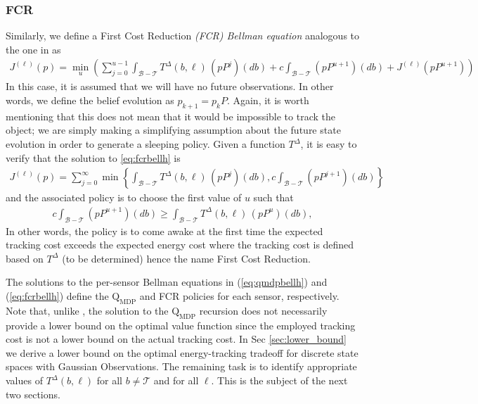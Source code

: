 \documentclass[journal,draftcls,onecolumn,11pt]{IEEEtran}
\newcommand{\QMDP}{$\text{Q}_{\text{MDP}}$}
\newcommand{\term}{\mathcal{T}}
\begin{document}
\subsubsection{FCR}
Similarly, we define a First Cost Reduction {\em (FCR) Bellman equation} analogous to the one in \cite{fuemmeler08} as
\begin{align} \label{eq:fcrbellh}
   J^{(\ell)}(p) = \min_{u} \left(
      \sum_{j=0}^{u-1} \int_{\mathcal{B}-\term} T^\Delta(b,\ell) \, (p P^j)(db) +
      c \int_{\mathcal{B}-\term}  (p P^{u+1})(db) +
      J^{(\ell)}(p P^{u+1})
   \right)
\end{align}
In this case, it is assumed that we will have no future observations. In other words, we define the belief evolution as $p_{k+1}=p_kP$. Again, it is worth mentioning that this does not mean that it would be impossible to track the object; we are simply making a simplifying assumption about the future state evolution in order to generate a sleeping policy. Given a function $T^\Delta$, it is easy to verify that the solution to \eqref{eq:fcrbellh} is
\begin{align}
   J^{(\ell)}(p) = \sum_{j=0}^{\infty} \min \left\{
      \int_{\mathcal{B}-\term} T^\Delta(b,\ell) \, (p P^j)(db),
      c \int_{\mathcal{B}-\term}  (p P^{j+1})(db)
   \right\}
\end{align}
and the associated policy is to choose the first value of $u$ such that
\begin{align}
      c \int_{\mathcal{B}-\term}  (p P^{u+1})(db) \geq
      \int_{\mathcal{B}-\term} T^\Delta(b,\ell) \, (p P^u)(db),
\end{align}
In other words, the policy is to come awake at the first time the expected tracking cost exceeds the expected energy cost where the tracking cost is defined based on $T^\Delta$ (to be determined) hence the name First Cost Reduction.

The solutions to the per-sensor Bellman equations in (\ref{eq:qmdpbellh}) and (\ref{eq:fcrbellh}) define the \QMDP{} and FCR policies for each sensor, respectively. Note that, unlike \cite{fuemmeler08,asilomar_scheduling,tsp_scheduling}, the solution to the \QMDP{} recursion does not necessarily provide a lower bound on the optimal value function since the employed tracking cost is not a lower bound on the actual tracking cost. In Sec \ref{sec:lower_bound} we derive a lower bound on the optimal energy-tracking tradeoff for discrete state spaces with Gaussian Observations. The remaining task is to identify appropriate values of $T^\Delta(b,\ell)$ for all $b \neq \term$ and for all $\ell$.  This is the subject of the next two sections.
\end{document}

